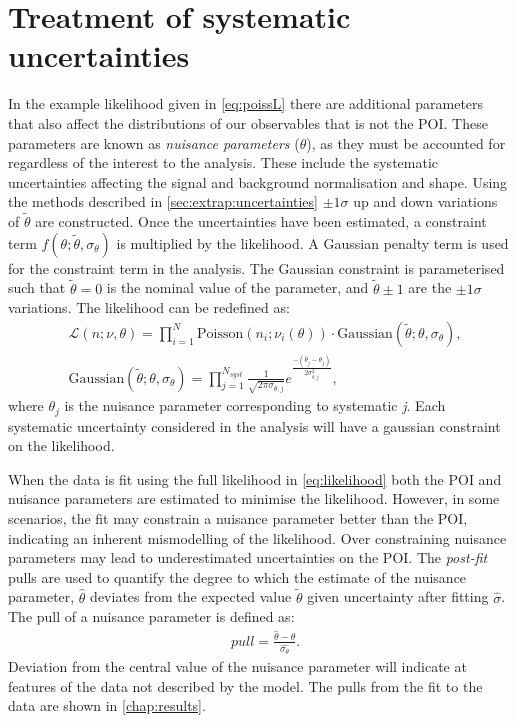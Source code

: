 \section{Treatment of systematic uncertainties}
In the example likelihood given in \cref{eq:poissL} there are additional parameters that also affect the distributions of our observables that is not the POI. These parameters are known as \emph{nuisance parameters} ($\theta$), as they must be accounted for regardless of the interest to the analysis. These include the systematic uncertainties affecting the signal and background normalisation and shape. Using the methods described in \cref{sec:extrap:uncertainties} $\pm  1\sigma$ up and down variations of $\tilde{\theta}$ are constructed. Once the uncertainties have been estimated, a constraint term $f(\theta;\tilde{\theta},\sigma_\theta)$ is multiplied by the likelihood. A Gaussian penalty term is used for the constraint term in the analysis. The Gaussian constraint is parameterised such that $\tilde{\theta} = 0$ is the nominal value of the parameter, and $\tilde{\theta} \pm 1$ are the $\pm1\sigma$ variations. The likelihood can be redefined as:
\begin{equation}
    \label{eq:likelihood}
    \begin{aligned}
        & \mathcal{L}(n;\nu,\theta) = \prod_{i=1}^{N}\mathrm{Poisson}(n_i;\nu_i(\theta)) \cdot \mathrm{Gaussian}(\tilde{\theta};\theta,\sigma_\theta), \\
        & \mathrm{Gaussian}(\tilde{\theta};\theta,\sigma_\theta) = \prod_{j=1}^{N_{syst}} \frac{1}{\sqrt{2\pi\sigma_{\theta,j}}} e^\frac{-(\tilde{\theta_j} - \theta_j)}{2\sigma_{\theta,j}^2},
    \end{aligned}
\end{equation}
where $\theta_j$ is the nuisance parameter corresponding to systematic \emph{j}. Each systematic uncertainty considered in the analysis will have a gaussian constraint on the likelihood. 

When the data is fit using the full likelihood in \cref{eq:likelihood} both the POI and nuisance parameters are estimated to minimise the likelihood. However, in some scenarios, the fit may constrain a nuisance parameter better than the POI, indicating an inherent mismodelling of the likelihood. Over constraining nuisance parameters may lead to underestimated uncertainties on the POI. The \emph{post-fit} pulls are used to quantify the degree to which the estimate of the nuisance parameter, $\hat{\theta}$ deviates from the expected value $\tilde{\theta}$ given uncertainty after fitting $\hat{\sigma}$. The pull of a nuisance parameter is defined as: 
\begin{equation}
    \label{eq:nppull}
    \begin{aligned}
        & pull = \frac{\hat{\theta} -{\theta}}{\hat{\sigma_\theta}}.
    \end{aligned}
\end{equation}
Deviation from the central value of the nuisance parameter will indicate at features of the data not described by the model. The pulls from the fit to the data are shown in \cref{chap:results}. 

